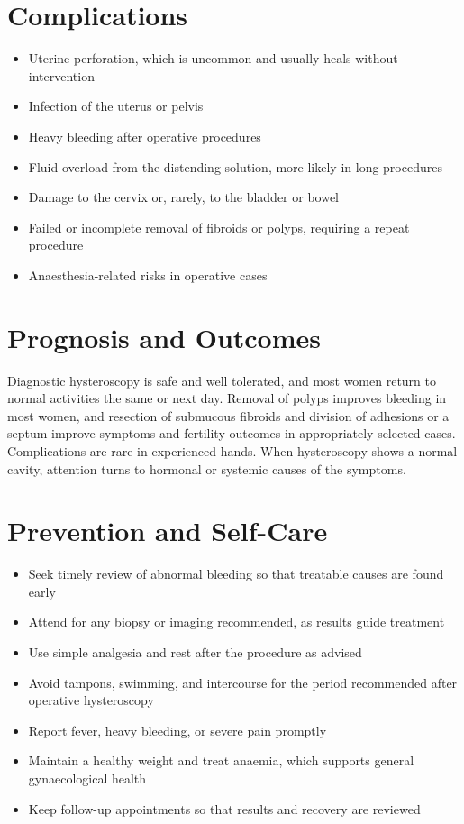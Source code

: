 \section*{Complications}
\begin{itemize}
    \item Uterine perforation, which is uncommon and usually heals without intervention
    \item Infection of the uterus or pelvis
    \item Heavy bleeding after operative procedures
    \item Fluid overload from the distending solution, more likely in long procedures
    \item Damage to the cervix or, rarely, to the bladder or bowel
    \item Failed or incomplete removal of fibroids or polyps, requiring a repeat procedure
    \item Anaesthesia-related risks in operative cases
\end{itemize}

\section*{Prognosis and Outcomes}
Diagnostic hysteroscopy is safe and well tolerated, and most women return to normal activities the same or next day. Removal of polyps improves bleeding in most women, and resection of submucous fibroids and division of adhesions or a septum improve symptoms and fertility outcomes in appropriately selected cases. Complications are rare in experienced hands. When hysteroscopy shows a normal cavity, attention turns to hormonal or systemic causes of the symptoms.

\section*{Prevention and Self-Care}
\begin{itemize}
    \item Seek timely review of abnormal bleeding so that treatable causes are found early
    \item Attend for any biopsy or imaging recommended, as results guide treatment
    \item Use simple analgesia and rest after the procedure as advised
    \item Avoid tampons, swimming, and intercourse for the period recommended after operative hysteroscopy
    \item Report fever, heavy bleeding, or severe pain promptly
    \item Maintain a healthy weight and treat anaemia, which supports general gynaecological health
    \item Keep follow-up appointments so that results and recovery are reviewed
\end{itemize}

